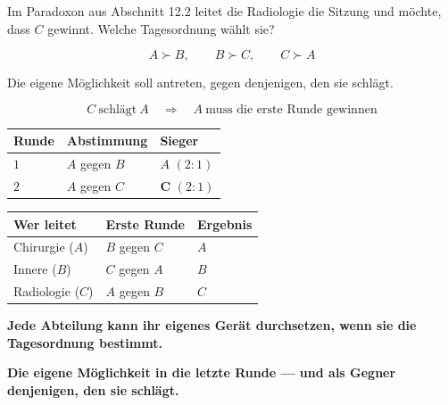 \begin{aufgabe}
Im Paradoxon aus Abschnitt 12.2 leitet die Radiologie die Sitzung und möchte, dass $C$ gewinnt. Welche Tagesordnung wählt sie?

\loesung
{}
\[ A \succ B, \qquad B \succ C, \qquad C \succ A \]

Die eigene Möglichkeit soll  antreten, gegen denjenigen, den sie schlägt.

\[ C \ \text{schlägt} \ A \quad\Longrightarrow\quad A \ \text{muss die erste Runde gewinnen} \]

\begin{center}
{\small
\renewcommand{\arraystretch}{1.5}
\begin{tabular}{@{}P{1.8cm}P{2.8cm}P{2.6cm}@{}}
\toprule
\textbf{Runde} & \textbf{Abstimmung} & \textbf{Sieger}\\
\midrule
$1$ & $A$ gegen $B$ & $A$ $(2:1)$\\
$2$ & $A$ gegen $C$ & $\mathbf{C}$ $(2:1)$\\
\bottomrule
\end{tabular}}
\end{center}

\begin{center}
{\small
\renewcommand{\arraystretch}{1.5}
\begin{tabular}{@{}P{2.6cm}P{2.4cm}P{2.4cm}@{}}
\toprule
\textbf{Wer leitet} & \textbf{Erste Runde} & \textbf{Ergebnis}\\
\midrule
Chirurgie ($A$) & $B$ gegen $C$ & $A$\\
Innere ($B$) & $C$ gegen $A$ & $B$\\
Radiologie ($C$) & $A$ gegen $B$ & $C$\\
\bottomrule
\end{tabular}}
\end{center}

\begin{center}
\begin{minipage}{0.9\textwidth}
\textbf{Jede Abteilung kann ihr eigenes Gerät durchsetzen, wenn sie die Tagesordnung bestimmt.}
\end{minipage}
\end{center}

\begin{center}
\begin{minipage}{0.9\textwidth}
\textbf{Die eigene Möglichkeit in die letzte Runde --- und als Gegner denjenigen, den sie schlägt.}
\end{minipage}
\end{center}


\end{aufgabe}
